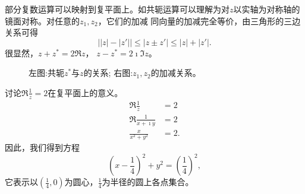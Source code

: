 部分复数运算可以映射到复平面上。如共轭运算可以理解为对$z$以实轴为对称轴的镜面对称。对任意的$z_1,z_2$，它们的加减
同向量的加减完全等价，由三角形的三边关系可得
\begin{equation}
    \left| |z|- |z'| \right| \leq |z \pm z'| \leq |z| + |z'| .
\end{equation}
很显然，$z+z^{*} = 2 \Re z$， $z-z^{*} = 2\imath \Im z$。
\begin{figure}
    \centering
    
\quad 
        
        \caption{左图:共轭$z^{*}$与$z$的关系; 右图:$z_1, z_2$的加减关系。}
    \end{figure}
\begin{examplebox}{讨论$\Re \frac{1}{z} = 2$在复平面上的意义。}
    \begin{align*}
        \Re \frac{1}{z} &= 2\\
        \Re \frac{1}{x+\imath y} &  = 2 \\
        \frac{x}{x^2 +y^2} & = 2 .
    \end{align*}
因此，我们得到方程
\begin{equation*}
    (x-\frac{1}{4})^2 + y^2 = \left( \frac{1}{4}\right)^2,
\end{equation*}
它表示以$(\frac{1}{4},0)$为圆心，$\frac{1}{4}$为半径的圆上各点集合。
\end{examplebox}
        


